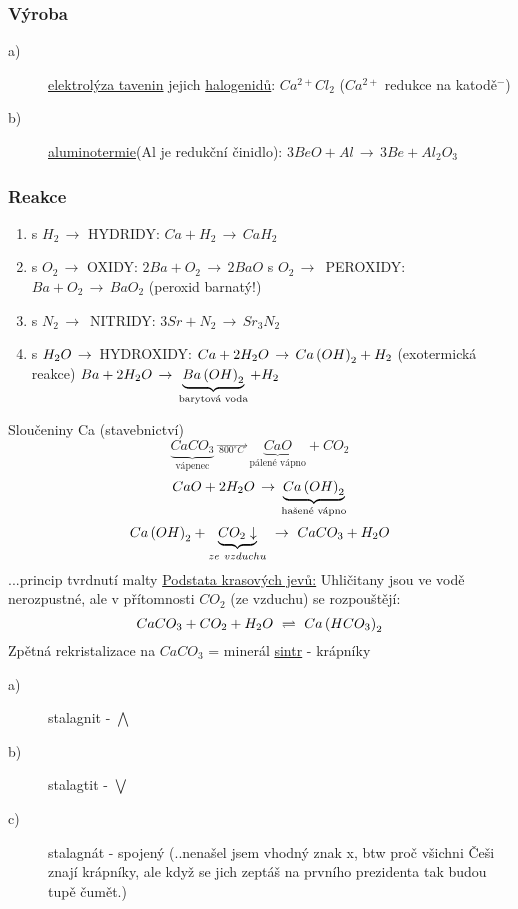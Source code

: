     \subsubsection*{Výroba}
        \begin{description}
            \item[a)] \underline{elektrolýza tavenin} jejich \underline{halogenidů}: \textbf{\(Ca^{2+}Cl_2\)} ($Ca^{2+}$ redukce na katodě$^-$)
            \item[b)] \underline{aluminotermie}(Al je redukční činidlo): \(3BeO + Al \,\to\, 3Be + Al_2 O_3\)
        \end{description}
    \subsubsection{Reakce}
    \begin{enumerate}
        \item s $H_2 \,\to$ HYDRIDY: \tab $Ca + H_2 \,\to\, CaH_2$
        \item s $O_2 \,\to$ OXIDY: \tab $2Ba + O_2 \,\to\, 2BaO$
            \newline s $O_2 \,\to\,$ PEROXIDY: \tab $Ba + O_2 \,\to\, BaO_2$ (peroxid barnatý!)
        \item s $N_2 \,\to\,$ NITRIDY: \tab $3Sr + N_2 \,\to\, Sr_3 N_2$
        \item s $H_2O \,\to\,$ HYDROXIDY: \tab $Ca+2H_2O \,\to\, Ca \left( OH \right) _2 + H_2$ (exotermická reakce)
            \newline \tab\tab $Ba + 2H_2O \,\to\, \underbrace{Ba \left( OH \right) _2}_\text{barytová voda} + H_2$ 
    \end{enumerate}
    Sloučeniny Ca (stavebnictví)
    \[\underbrace{CaCO_3}_\text{vápenec} \,\overrightarrow{\, _{800^\circ C} \,} \, \underbrace{CaO}_\text{pálené vápno} + CO_2\]
    \newline
    \[CaO + 2H_2O \,\to\, \underbrace{Ca \left(OH\right)_2}_\text{hašené vápno}\]
    \newline
    \[Ca\left(OH\right)_2 + \underbrace{CO_2 \downarrow}_{ze~vzduchu} ~\to~ CaCO_3 + H_2O\] ...princip tvrdnutí malty
    \newline \newline
    \underline{Podstata krasových jevů:} Uhličitany jsou ve vodě nerozpustné, ale v přítomnosti $CO_2$ (ze vzduchu) se rozpouštějí:
    \[CaCO_3 + CO_2 + H_2O ~\rightleftharpoons ~ Ca \left( HCO_3 \right)_2 \]
    Zpětná rekristalizace na $CaCO_3$ = minerál \underline{sintr} - krápníky
    \begin{description}
        \item[a)] stalagnit - $\bigwedge$
        \item[b)] stalagtit - $\bigvee$
        \item[c)] stalagnát - spojený \tiny{(..nenašel jsem vhodný znak x, btw proč všichni Češi znají krápníky, ale když se jich zeptáš na prvního prezidenta tak budou tupě čumět.)}
    \end{description}


